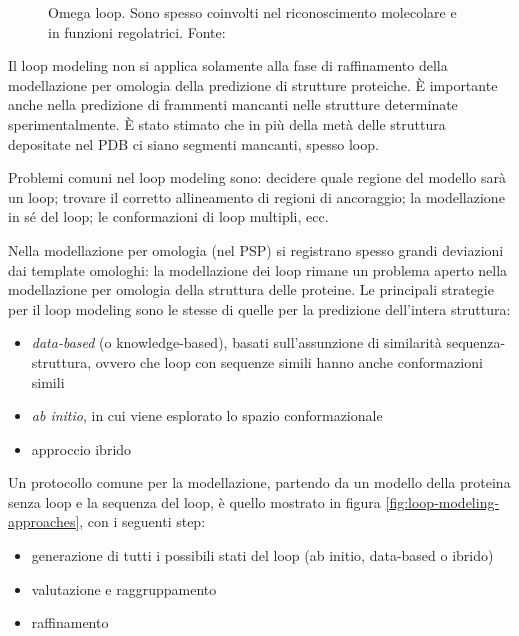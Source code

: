 {\begin{figure}[!htb]
	\caption{Omega loop. Sono spesso coinvolti nel riconoscimento molecolare e in funzioni regolatrici. Fonte: \cite{Papaleo2016TheRO}}
	\label{fig:omega-loops}
	\endminipage\hfill
\end{figure}

Il loop modeling non si applica solamente alla fase di raffinamento della modellazione per omologia della predizione di strutture proteiche. È importante anche nella predizione di frammenti mancanti nelle strutture determinate sperimentalmente. È stato stimato che in più della metà delle struttura depositate nel PDB ci siano segmenti mancanti, spesso loop\supercite{karami2018dareus}.

\par Problemi comuni nel loop modeling sono: decidere quale regione del modello sarà un loop; trovare il corretto allineamento di regioni di ancoraggio; la modellazione in sé del loop; le conformazioni di loop multipli, ecc.

\par Nella modellazione per omologia (nel PSP) si registrano spesso grandi deviazioni dai template omologhi: la modellazione dei loop rimane un problema aperto nella modellazione per omologia della struttura delle proteine\supercite{karamiLoop}. Le principali strategie per il loop modeling sono le stesse di quelle per la predizione dell'intera struttura:
\begin{itemize}
	\item \textit{data-based} (o knowledge-based), basati sull'assunzione di similarità sequenza-struttura, ovvero che loop con sequenze simili hanno anche conformazioni simili
	\item \textit{ab initio}, in cui viene esplorato lo spazio conformazionale
	\item approccio ibrido
\end{itemize}

\par Un protocollo comune per la modellazione, partendo da un modello della proteina senza loop e la sequenza del loop, è quello mostrato in figura \ref{fig:loop-modeling-approaches}, con i seguenti step:
\begin{itemize}
	\item generazione di tutti i possibili stati del loop (ab initio, data-based o ibrido)
	\item valutazione e raggruppamento
	\item raffinamento
\end{itemize}

}
